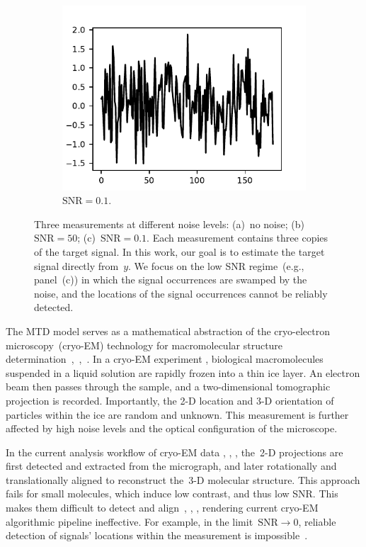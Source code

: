 \documentclass{article}
\begin{document}
\begin{figure}[!tb]
\begin{subfigure}[ht]{0.33\textwidth}
		\includegraphics[width=\columnwidth]{figures/y_SNR01.pdf}
		\caption{$\text{SNR} = 0.1$.}
	\end{subfigure}
	\caption{Three measurements at different noise levels: (a)~no noise; (b)~\mbox{$\text{SNR} = 50$}; (c)~\mbox{$\text{SNR} = 0.1$}. Each measurement contains three copies of the target signal. In this work, our goal is to estimate the target signal directly from~$y$. We focus on the low SNR regime~(e.g., panel~(c)) in which the signal occurrences are swamped by the noise, and the locations of the signal occurrences cannot be reliably detected.}
\label{fig:measurements}
\end{figure}

The MTD model serves as a mathematical abstraction of the cryo-electron microscopy~(\mbox{cryo-EM}) technology for macromolecular structure determination~\cite{henderson1995potential},~\cite{nogales2016development},~\cite{bai2015cryo}. In a \mbox{cryo-EM} experiment \cite{frank2006three}, biological macromolecules suspended in a liquid solution are rapidly frozen into a thin ice layer. An electron beam then passes through the sample, and a two-dimensional tomographic projection is recorded. Importantly, the \mbox{2-D} location and \mbox{3-D} orientation of particles within the ice are random and unknown. This measurement is further affected by high noise levels and the optical configuration of the microscope.

In the current analysis workflow of \mbox{cryo-EM} data \cite{bendory2020single}, \cite{scheres2012relion}, \cite{punjani2017cryosparc}, the~\mbox{2-D} projections are first detected and extracted from the micrograph, and later rotationally and translationally aligned to reconstruct the~\mbox{3-D} molecular structure. This approach fails for small molecules, which induce low contrast, and thus low SNR. This makes them difficult to detect and align~\cite{bendory2018toward}, \cite{henderson1995potential}, \cite{aguerrebere2016fundamental}, rendering current \mbox{cryo-EM} algorithmic pipeline ineffective. For example, in the limit~\mbox{$\text{SNR} \rightarrow 0$}, reliable detection of signals' locations within the measurement is impossible~\cite[Proposition~3.1]{bendory2018toward}.
\end{document}
